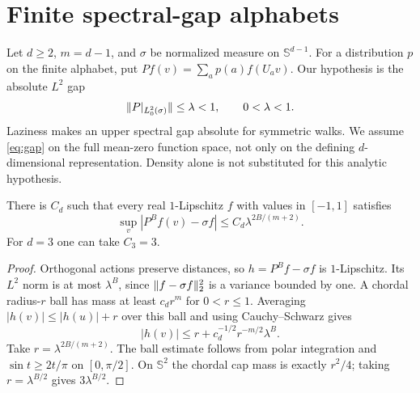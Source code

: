 \section{Finite spectral-gap alphabets}\label{sec:spectral}
Let $d\ge2$, $m=d-1$, and $\sigma$ be normalized measure on
$\mathbb S^{d-1}$. For a distribution $p$ on the finite alphabet, put
$Pf(v)=\sum_ap(a)f(U_av)$. Our hypothesis is the absolute $L^2$ gap
\begin{equation}\label{eq:gap}
 \lVert P|_{L^2_0(\sigma)}\rVert\le\lambda<1,\qquad 0<\lambda<1.
\end{equation}
Laziness makes an upper spectral gap absolute for symmetric walks.
We assume \eqref{eq:gap} on the full mean-zero function space, not only
on the defining $d$-dimensional representation. Density alone is not
substituted for this analytic hypothesis.

\begin{lemma}\label{lem:mixing}
There is $C_d$ such that every real $1$-Lipschitz $f$ with values in
$[-1,1]$ satisfies
\begin{equation}\label{eq:mixing}
 \sup_v|P^Bf(v)-\sigma f|\le C_d\lambda^{2B/(m+2)}.
\end{equation}
For $d=3$ one can take $C_3=3$.
\end{lemma}
\begin{proof}
Orthogonal actions preserve distances, so $h=P^Bf-\sigma f$ is
$1$-Lipschitz. Its $L^2$ norm is at most $\lambda^B$, since
$\lVert f-\sigma f\rVert_2^2$ is a variance bounded by one.
A chordal radius-$r$ ball has mass at least $c_dr^m$ for $0<r\le1$.
Averaging $|h(v)|\le |h(u)|+r$ over this ball and using
Cauchy--Schwarz gives
\[
 |h(v)|\le r+c_d^{-1/2}r^{-m/2}\lambda^B.
\]
Take $r=\lambda^{2B/(m+2)}$. The ball estimate follows from polar
integration and $\sin t\ge2t/\pi$ on $[0,\pi/2]$.
On $\mathbb S^2$ the chordal cap mass is exactly $r^2/4$;
taking $r=\lambda^{B/2}$ gives $3\lambda^{B/2}$.
\end{proof}

